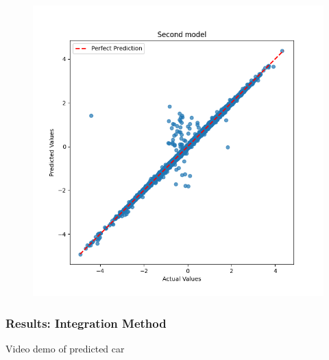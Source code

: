 \begin{frame}
\begin{figure}
\begin{minipage}[b]{0.45\linewidth}
      \includegraphics[width=\textwidth]{figures/graphs/Second model.png}
    \end{minipage}
  \end{figure}
\end{frame}

\begin{frame}
  \frametitle{Results: Integration Method}
    \center Video demo of predicted car
\end{frame}
